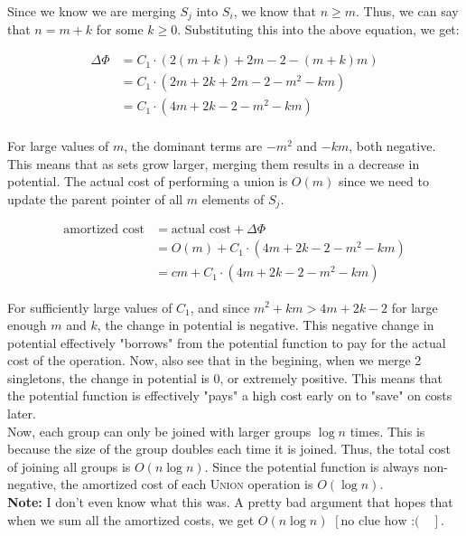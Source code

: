 \documentclass[a4paper]{article}
\begin{document}
\noindent Since we know we are merging $S_j$ into $S_i$, we know that $n \geq m$. Thus, we can say that $n = m + k$ for some $k \geq 0$. Substituting this into the above equation, we get:

\begin{align*}
    \Delta \Phi &= C_1 \cdot \left(2(m+k) + 2m - 2 - (m+k)m \right)\\
    &= C_1 \cdot \left(2m + 2k + 2m - 2 - m^2 - km \right)\\
    &= C_1 \cdot \left(4m + 2k - 2 - m^2 - km \right)\\
\end{align*}

\noindent For large values of $m$, the dominant terms are $-m^2$ and $-km$, both negative. This means that as sets grow larger, merging them results in a decrease in potential. The actual cost of performing a union is $O(m)$ since we need to update the parent pointer of all $m$ elements of $S_j$.

\begin{align*}
    \text{amortized cost} &= \text{actual cost} + \Delta \Phi\\
    &= O(m) + C_1 \cdot \left(4m + 2k - 2 - m^2 - km \right)\\
    &= cm + C_1 \cdot \left(4m + 2k - 2 - m^2 - km \right)
\end{align*}

\noindent For sufficiently large values of $C_1$, and since $m^2 + km > 4m + 2k - 2$ for large enough $m$ and $k$, the change in potential is negative. This negative change in potential effectively "borrows" from the potential function to pay for the actual cost of the operation. Now, also see that in the begining, when we merge 2 singletons, the change in potential is $0$, or extremely positive. This means that the potential function is effectively "pays" a high cost early on to "save" on costs later.\\

\noindent Now, each group can only be joined with larger groups $\log n$ times. This is because the size of the group doubles each time it is joined. Thus, the total cost of joining all groups is $O(n \log n)$. Since the potential function is always non-negative, the amortized cost of each \textsc{Union} operation is $O(\log n)$. \\

\noindent \textbf{Note:} I don't even know what this was. A pretty bad argument that hopes that when we sum all the amortized costs, we get $O(n \log n)$ $\left[ \text{no clue how  :(} \quad \right]$.
\end{document}
